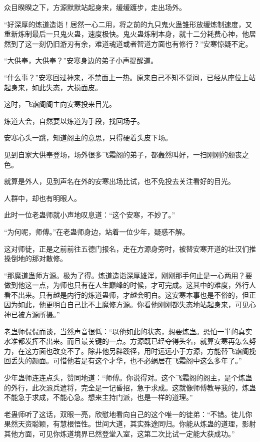 
\begin{this_body}

众目睽睽之下，方源默默站起身来，缓缓踱步，走出场外。

“好深厚的炼道造诣！居然一心二用，将之前的九只鬼火蛊雏形放缓炼制速度，又重新炼制最后一只鬼火蛊，速度极快。鬼火蛊炼制本身，就十二分耗费心神，他居然到了这一刻仍旧游刃有余，难道魂道或者智道方面也有修行？”安寒惊疑不定。

“大供奉，大供奉？”安寒身边的弟子小声提醒道。

“什么事？”安寒回过神来，不禁面上一热。原来自己不知不觉间，已经从座位上站起身来，如此失态，大损面皮。

这时，飞霜阁阁主向安寒投来目光。

炼道大会，自然要以炼道为手段，找回场子。

安寒心头一跳，知道阁主的意思，只得硬着头皮下场。

见到自家大供奉登场，场外很多飞霜阁的弟子，都轰然叫好，一扫刚刚的颓丧之色。

就算是外人，见到声名在外的安寒出场比试，也不免投去关注看好的目光。

人群中，却也有明眼人。

此时一位老蛊师就小声地叹息道：“这个安寒，不妙了。”

“为何呢，师傅。”在老蛊师身边，站着一位少年，疑惑不解。

这对师徒，正是之前前往五德门报名，走在方源身旁时，被替安寒开道的壮汉们推搡倒地的那对散修。

“那魔道蛊师方源。极为了得。炼道造诣深厚雄浑，刚刚那手何止是一心两用？要做到他这一点，为师也只有在人生巅峰的时候，才可完成。这其中的难度，外行人看不出来。只有越是内行的炼道蛊师，才越会明白。这安寒本事也是不俗的，但正因为如此，他更明白自己比不上魔修方源。你看他刚刚都失态地站起身来，可见心神已被方源所摄。”

老蛊师侃侃而谈，当然声音很低：“以他如此的状态，想要炼蛊。恐怕一半的真实水准都发挥不出来。而且最关键的一点。方源既已经夺得头名，就算安寒再怎么努力，在这方面也改变不了。除非他另辟蹊径，用时远远小于方源，方能替飞霜阁挽回丢失的颜面。可惜他若是有这个才华，也不必蜗居在飞霜阁中这么多年了。”

少年蛊师连连点头，赞同地道：“师傅。你说得对。这个飞霜阁的阁主，是个炼蛊的外行，此次派兵遣将，完全是一记昏招，急于求成。这就像师傅教导我的，炼蛊不能急于求成，不能心急。想来主持门派，也是一样的道理。”

老蛊师听了这话，双眼一亮，欣慰地看向自己的这个唯一的徒弟：“不错。徒儿你果然天资聪颖，有慧根悟性。世间大道，其实殊途同归。你能从炼蛊的道理，影射其他方面，可见你炼道境界已然登堂入室，这第二次比试一定能大获成功。”


\end{this_body}
